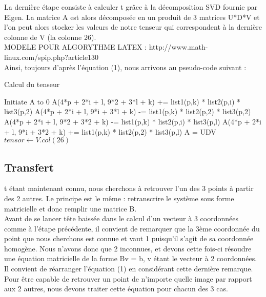 \documentclass[a4paper,10pt]{report}
\begin{document}
La dernière étape consiste à calculer t grâce à la décomposition SVD fournie par Eigen. La matrice A est alors décomposée en un produit de 3 matrices U*D*V et l’on peut alors stocker les valeurs de notre tenseur qui correspondent à la dernière colonne de V (la colonne 26).
\\

MODELE POUR ALGORYTHME LATEX : http://www.math-linux.com/spip.php?article130
\\

Ainsi, toujours d’après l’équation (1),  nous arrivons au pseudo-code suivant :
\begin{algorithm}
\caption{Calcul du tenseur}
\begin{algorithmic}
\STATE Initiate A to 0
\STATE A(4*p + 2*i + l, 9*2 + 3*l + k) += list1(p,k) * list2(p,i) * list3(p,2)
\STATE A(4*p + 2*i + l, 9*i + 3*l + k) -= list1(p,k) * list2(p,2) * list3(p,2)
\STATE A(4*p + 2*i + l, 9*2 + 3*2 + k) -= list1(p,k) * list2(p,i) * list3(p,l)
\STATE A(4*p + 2*i + l, 9*i + 3*2 + k) += list1(p,k) * list2(p,2) * list3(p,l)
\ENDFOR
\ENDFOR
\ENDFOR
\ENDFOR
\STATE A = UDV 
\STATE $tensor \leftarrow V.col(26)$
\end{algorithmic}
\end{algorithm}


\subsection{Transfert}


t étant maintenant connu, nous cherchons à retrouver l’un des 3 points à partir des 2 autres. Le principe est le même : retranscrire le système sous forme matricielle et donc remplir une matrice B.
\\

Avant de se lancer tête baissée dans le calcul d’un vecteur à 3 coordonnées comme à l’étape précédente, il convient de remarquer que la 3ème coordonnée du point que nous cherchons est connue et vaut 1 puisqu’il s’agit de sa coordonnée homogène. Nous n’avons donc que 2 inconnues, et devons cette fois-ci résoudre une équation matricielle de la forme Bv = b, v étant le vecteur à 2 coordonnées.
\\

Il convient de réarranger l’équation (1) en considérant cette dernière remarque. Pour être capable de retrouver un point de n’importe quelle image par rapport aux 2 autres, nous devons traiter cette équation pour chacun des 3 cas.
\\
\end{document}
